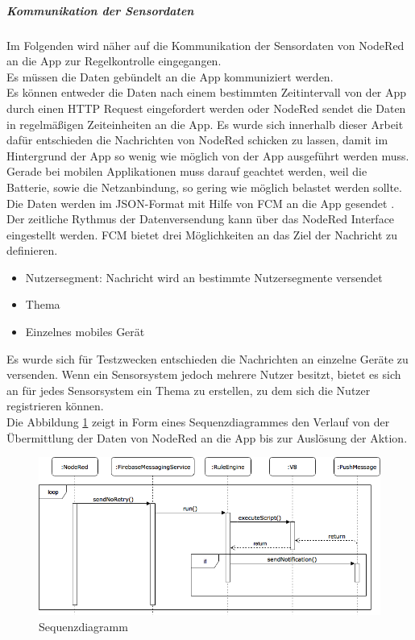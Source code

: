 \subparagraph{Kommunikation der Sensordaten}
Im Folgenden wird näher auf die Kommunikation der Sensordaten von NodeRed an die App zur Regelkontrolle eingegangen.\\
Es müssen die Daten gebündelt an die App kommuniziert werden.\\
Es können entweder die Daten nach einem bestimmten Zeitintervall von der App durch einen HTTP Request eingefordert werden oder NodeRed sendet die Daten in regelmäßigen Zeiteinheiten an die App. Es wurde sich innerhalb dieser Arbeit dafür entschieden die Nachrichten von NodeRed schicken zu lassen, damit im Hintergrund der App so wenig wie möglich von der App ausgeführt werden muss. Gerade bei mobilen Applikationen muss darauf geachtet werden, weil die Batterie, sowie die Netzanbindung, so gering wie möglich belastet werden sollte.\\
Die Daten werden im JSON-Format mit Hilfe von \ac{FCM} an die App gesendet \cite{firebase:gcm}. Der zeitliche Rythmus der Datenversendung kann über das NodeRed Interface eingestellt werden. \ac{FCM} bietet drei Möglichkeiten an das Ziel der Nachricht zu definieren.
\begin{itemize}
	\item Nutzersegment: Nachricht wird an bestimmte Nutzersegmente versendet
	\item Thema
	\item Einzelnes mobiles Gerät
\end{itemize}
Es wurde sich für Testzwecken entschieden die Nachrichten an einzelne Geräte zu versenden. Wenn ein Sensorsystem jedoch mehrere Nutzer besitzt, bietet es sich an für jedes Sensorsystem ein Thema zu erstellen, zu dem sich die Nutzer registrieren können.\\
Die Abbildung \ref{fig:sequenzdiagramm} zeigt in Form eines Sequenzdiagrammes den Verlauf von der Übermittlung der Daten von NodeRed an die App bis zur Auslösung der Aktion.
\begin{figure}
	\centering
	\includegraphics[width=1\textwidth]{images/Sequenzdiagramm.png}
	\caption{Sequenzdiagramm}
	\label{fig:sequenzdiagramm}
\end{figure}

